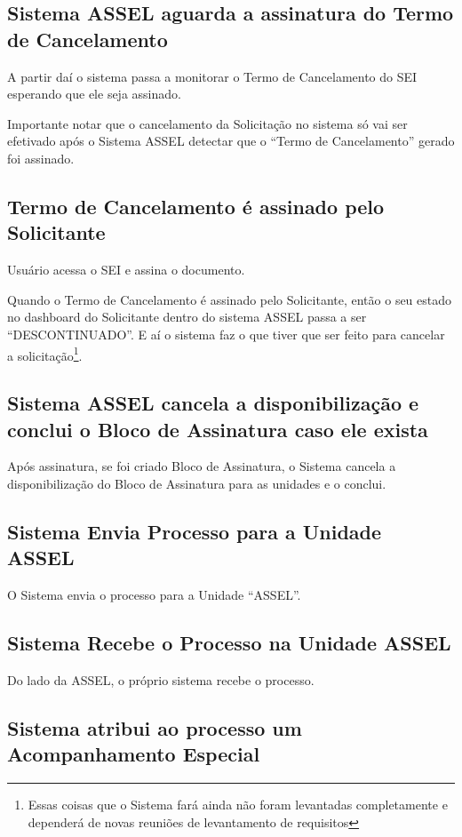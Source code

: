 \subsection{Sistema ASSEL aguarda a assinatura do Termo de Cancelamento}


A partir daí o sistema passa a monitorar o Termo de Cancelamento do SEI esperando que ele seja assinado.

Importante notar que o cancelamento da Solicitação no sistema só vai ser efetivado após o Sistema ASSEL detectar que o ``Termo de Cancelamento'' gerado foi assinado.

\subsection{Termo de Cancelamento é assinado pelo Solicitante}

Usuário acessa o SEI e assina o documento.

Quando o Termo de Cancelamento é assinado pelo Solicitante, então o seu estado no dashboard do Solicitante dentro do sistema ASSEL passa a ser ``DESCONTINUADO''. E aí o sistema faz o que tiver que ser feito para cancelar a solicitação\footnote{Essas coisas que o Sistema fará ainda não foram levantadas completamente e dependerá de novas reuniões de levantamento de requisitos}.

\subsection{Sistema ASSEL cancela a disponibilização e conclui o Bloco de Assinatura caso ele exista}

Após assinatura, se foi criado Bloco de Assinatura, o Sistema cancela a disponibilização do Bloco de Assinatura para as unidades e o conclui.

\subsection{Sistema Envia Processo para a Unidade ASSEL}

O Sistema envia o processo para a Unidade ``ASSEL''.

\subsection{Sistema Recebe o Processo na Unidade ASSEL}

Do lado da ASSEL, o próprio sistema recebe o processo.

\subsection{Sistema atribui ao processo um Acompanhamento Especial}

